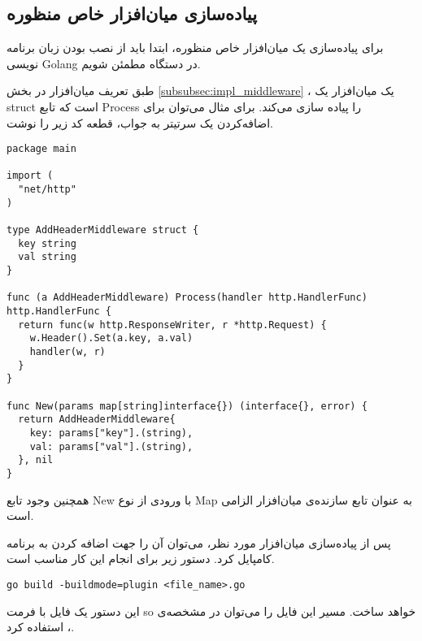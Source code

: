 \subsection*{پیاده‌سازی میان‌افزار خاص منظوره}
برای پیاده‌سازی یک میان‌افزار خاص منظوره، ابتدا باید از نصب بودن زبان برنامه نویسی Golang در دستگاه مطمئن شویم.

طبق تعریف میان‌افزار در بخش
\ref{subsubsec:impl_middleware}
، یک میان‌افزار یک struct است که تابع Process را پیاده سازی می‌کند. برای مثال می‌توان برای اضافه‌کردن یک سرتیتر به جواب، قطعه کد زیر را نوشت.

\begin{latin}
  \begin{lstlisting}
package main

import (
  "net/http"
)

type AddHeaderMiddleware struct {
  key string
  val string
}

func (a AddHeaderMiddleware) Process(handler http.HandlerFunc) http.HandlerFunc {
  return func(w http.ResponseWriter, r *http.Request) {
    w.Header().Set(a.key, a.val)
    handler(w, r)
  }
}

func New(params map[string]interface{}) (interface{}, error) {
  return AddHeaderMiddleware{
    key: params["key"].(string),
    val: params["val"].(string),
  }, nil
}

  \end{lstlisting}
\end{latin}

همچنین وجود تابع New با ورودی از نوع Map به عنوان تابع سازنده‌ی میان‌افزار الزامی است.

پس از پیاده‌سازی میان‌افزار مورد نظر، می‌توان آن‌ را جهت اضافه کردن به برنامه کامپایل کرد. دستور زیر برای انجام این کار مناسب است.

\begin{latin}
  \begin{lstlisting}
go build -buildmode=plugin <file_name>.go
  \end{lstlisting}
\end{latin}

این دستور یک فایل با فرمت so خواهد ساخت. مسیر این فایل را می‌توان در مشخصه‌ی ، استفاده کرد.